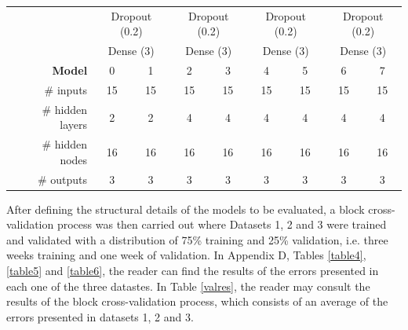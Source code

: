 \begin{table}[htbp]
\begin{tabular}{r|cccccccc}
          & \multicolumn{2}{c}{Dropout (0.2)} & \multicolumn{2}{c}{Dropout (0.2)} & \multicolumn{2}{c}{Dropout (0.2)} & \multicolumn{2}{c}{Dropout (0.2)} \\
          & \multicolumn{2}{c}{Dense (3)} & \multicolumn{2}{c}{Dense (3)} & \multicolumn{2}{c}{Dense (3)} & \multicolumn{2}{c}{Dense (3)} \\
    \midrule
    \textbf{Model} & 0     & 1     & 2     & 3     & 4     & 5     & 6     & 7 \\
    \midrule
    \# inputs & 15    & 15    & 15    & 15    & 15    & 15    & 15    & 15 \\
    \# hidden layers & 2     & 2     & 4     & 4     & 4     & 4     & 4     & 4 \\
    \# hidden nodes & 16    & 16    & 16    & 16    & 16    & 16    & 16    & 16 \\
    \# outputs & 3     & 3     & 3     & 3     & 3     & 3     & 3     & 3 \\
    \end{tabular}%
  \label{tableModels}%
\end{table}%

After defining the structural details of the models to be evaluated, a block cross-validation process was then carried out where Datasets 1, 2 and 3 were trained and validated with a distribution of 75\% training and 25\% validation, i.e. three weeks training and one week of validation. In Appendix D, Tables \ref{table4}, \ref{table5} and \ref{table6}, the reader can find the results of the errors presented in each one of the three datastes. In Table \ref{valres}, the reader may consult the results of the block cross-validation process, which consists of an average of the errors presented in datasets 1, 2 and 3.

